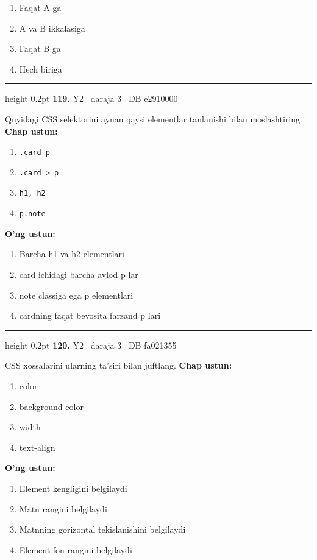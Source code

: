\documentclass[10pt,a4paper,oneside]{article}
\begin{document}
\begin{enumerate}[label=\Alph*),leftmargin=9mm]
\item Faqat A ga
\item A va B ikkalasiga
\item Faqat B ga
\item Hech biriga
\end{enumerate}
\vspace{2mm}\hrule height 0.2pt \vspace{4mm}
\hypertarget{q119}{\textbf{\color{ink}119.}}  {\color{muted}\scriptsize Y2 \textbullet\ daraja 3 \textbullet\ DB e2910000}
\par
Quyidagi CSS selektorini aynan qaysi elementlar tanlanishi bilan moslashtiring.
\textbf{\footnotesize Chap ustun:}
\begin{enumerate}[label=\arabic*),leftmargin=9mm]
\item \texttt{.card p}
\item \texttt{.card \textgreater{} p}
\item \texttt{h1, h2}
\item \texttt{p.note}
\end{enumerate}
\textbf{\footnotesize O'ng ustun:}
\begin{enumerate}[label=\Alph*),leftmargin=9mm]
\item Barcha h1 va h2 elementlari
\item card ichidagi barcha avlod p lar
\item note classiga ega p elementlari
\item cardning faqat bevosita farzand p lari
\end{enumerate}
\vspace{2mm}\hrule height 0.2pt \vspace{4mm}
\hypertarget{q120}{\textbf{\color{ink}120.}}  {\color{muted}\scriptsize Y2 \textbullet\ daraja 3 \textbullet\ DB fa021355}
\par
CSS xossalarini ularning ta'siri bilan juftlang.
\textbf{\footnotesize Chap ustun:}
\begin{enumerate}[label=\arabic*),leftmargin=9mm]
\item color
\item background-color
\item width
\item text-align
\end{enumerate}
\textbf{\footnotesize O'ng ustun:}
\begin{enumerate}[label=\Alph*),leftmargin=9mm]
\item Element kengligini belgilaydi
\item Matn rangini belgilaydi
\item Matnning gorizontal tekislanishini belgilaydi
\item Element fon rangini belgilaydi
\end{enumerate}
\end{document}

